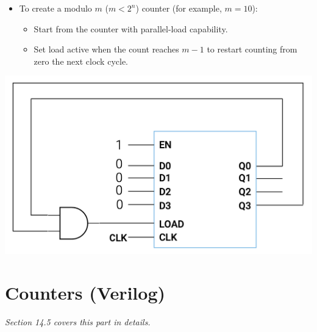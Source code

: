 \documentclass[12pt,openany]{book}
\begin{document}
\noindent
\begin{minipage}[htp]{0.45\textwidth}
    \begin{itemize}
        \item[] To create a modulo \(m\) (\(m < 2^n\)) counter (for example, \(m = 10\)):
        \begin{itemize}
            \item Start from the counter with parallel-load capability.
            \item Set load active when the count reaches \(m - 1\) to restart counting from zero the next clock cycle.
        \end{itemize}
    \end{itemize}
\end{minipage}
\hfill
\vline
\hfill
\begin{minipage}[htp]{0.45\textwidth}
    \centering
    \includegraphics[width=1.0\textwidth]{circuits/14.5_4.png} %
\end{minipage}
\newpage
\section{Counters (Verilog)}
\vspace*{-10px}
\textit{Section 14.5 covers this part in details.}
\end{document}
